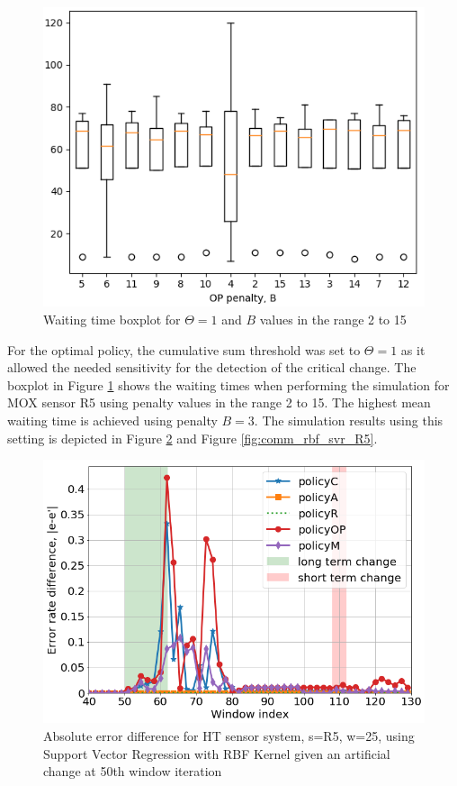 \documentclass{mpaper}
\begin{document}
\begin{figure}[h]
    \centering
    \includegraphics[scale=0.4]{imgs/boxplot_svr_waiting_R5.png}
    \caption{Waiting time boxplot for $\Theta=1$ and $B$ values in the range 2 to 15}
    \label{fig:boxplot_svr}
\end{figure}

For the optimal policy, the cumulative sum threshold was set to $\Theta=1$ as it allowed the needed sensitivity for the detection of the critical change. The boxplot in Figure \ref{fig:boxplot_svr} shows the waiting times when performing the simulation for MOX sensor R5 using penalty values in the range 2 to 15. The highest mean waiting time is achieved using penalty $B=3$. The simulation results using this setting is depicted in Figure \ref{fig:err_rbf_svr_R5} and Figure \ref{fig:comm_rbf_svr_R5}.

\begin{figure}[h]
    \centering
    \includegraphics[scale=0.33]{imgs/svr_rbf_R5_w25.png}
    \caption{Absolute error difference for HT sensor system, s=R5, w=25,
    using Support Vector Regression with RBF Kernel 
    given an artificial change at 50th window iteration}
    \label{fig:err_rbf_svr_R5}
\end{figure}
\end{document}
